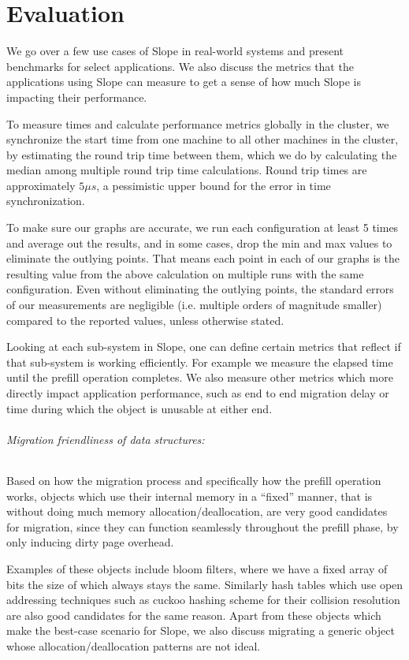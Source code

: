 \chapter{Evaluation}
\label{chap:evaluation}

We go over a few use cases of Slope in real-world systems and present
benchmarks for select applications. We also discuss
the metrics that the applications using Slope can measure to get a sense of
how much Slope is impacting their performance.

To measure times and calculate performance metrics globally in the cluster,
we synchronize the start time from one machine to all other machines in the
cluster, by estimating the round trip time between them, which we do by
calculating the median among multiple round trip time calculations. Round
trip times are approximately $5 {\mu}{s}$, a pessimistic upper bound for the
error in time synchronization.

To make sure our graphs are accurate, we run each configuration at least 5 times
and average out the results, and in some cases, drop the min and max values to
eliminate the outlying points. That means each point in each of our graphs is
the resulting value from the above calculation on multiple runs with the same
configuration. Even without eliminating the outlying points, the standard errors
of our measurements are negligible (i.e. multiple orders of magnitude smaller)
compared to the reported values, unless otherwise stated.

Looking at each sub-system in Slope, one can define certain metrics that
reflect if that sub-system is working efficiently. For example we measure
the elapsed time until the prefill operation completes. We also measure
other metrics which more directly impact application performance, such as
end to end migration delay or time during which the object is unusable at
either end.

\subparagraph{Migration friendliness of data structures:}
Based on how the migration process and specifically how the prefill operation
works, objects which use their internal memory in a ``fixed'' manner, that is
without doing much memory allocation/deallocation, are very good candidates
for migration, since they can function seamlessly throughout the prefill phase,
by only inducing dirty page overhead.

Examples of these objects include bloom filters, where we have a fixed
array of bits the size of which always stays the same.
Similarly hash tables which use open addressing techniques such as cuckoo
hashing scheme for their collision resolution are also good candidates for the
same reason.
Apart from these objects which make the best-case scenario for Slope, we also
discuss migrating a generic object whose allocation/deallocation patterns are not
ideal.

